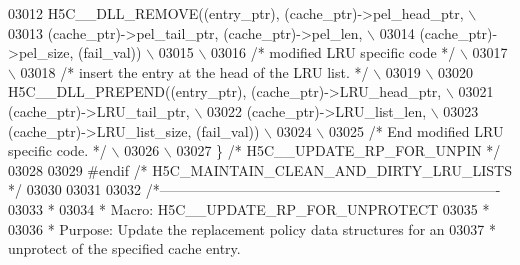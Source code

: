 \begin{DoxyCode}
03012 \textcolor{preprocessor}{    H5C\_\_DLL\_REMOVE((entry\_ptr), (cache\_ptr)->pel\_head\_ptr,            \(\backslash\)}
03013 \textcolor{preprocessor}{                    (cache\_ptr)->pel\_tail\_ptr, (cache\_ptr)->pel\_len,   \(\backslash\)}
03014 \textcolor{preprocessor}{                    (cache\_ptr)->pel\_size, (fail\_val))                 \(\backslash\)}
03015 \textcolor{preprocessor}{                                                                       \(\backslash\)}
03016 \textcolor{preprocessor}{        }\textcolor{comment}{/* modified LRU specific code */}\textcolor{preprocessor}{                               \(\backslash\)}
03017 \textcolor{preprocessor}{                                                                       \(\backslash\)}
03018 \textcolor{preprocessor}{        }\textcolor{comment}{/* insert the entry at the head of the LRU list. */}\textcolor{preprocessor}{            \(\backslash\)}
03019 \textcolor{preprocessor}{                                                                       \(\backslash\)}
03020 \textcolor{preprocessor}{        H5C\_\_DLL\_PREPEND((entry\_ptr), (cache\_ptr)->LRU\_head\_ptr,       \(\backslash\)}
03021 \textcolor{preprocessor}{                         (cache\_ptr)->LRU\_tail\_ptr,                    \(\backslash\)}
03022 \textcolor{preprocessor}{                         (cache\_ptr)->LRU\_list\_len,                    \(\backslash\)}
03023 \textcolor{preprocessor}{                         (cache\_ptr)->LRU\_list\_size, (fail\_val))       \(\backslash\)}
03024 \textcolor{preprocessor}{                                                                       \(\backslash\)}
03025 \textcolor{preprocessor}{        }\textcolor{comment}{/* End modified LRU specific code. */}\textcolor{preprocessor}{                          \(\backslash\)}
03026 \textcolor{preprocessor}{                                                                       \(\backslash\)}
03027 \textcolor{preprocessor}{\} }\textcolor{comment}{/* H5C\_\_UPDATE\_RP\_FOR\_UNPIN */}\textcolor{preprocessor}{}
03028 
03029 \textcolor{preprocessor}{#endif }\textcolor{comment}{/* H5C\_MAINTAIN\_CLEAN\_AND\_DIRTY\_LRU\_LISTS */}\textcolor{preprocessor}{}
03030 
03031 
03032 \textcolor{comment}{/*-------------------------------------------------------------------------}
03033 \textcolor{comment}{ *}
03034 \textcolor{comment}{ * Macro:   H5C\_\_UPDATE\_RP\_FOR\_UNPROTECT}
03035 \textcolor{comment}{ *}
03036 \textcolor{comment}{ * Purpose:     Update the replacement policy data structures for an}
03037 \textcolor{comment}{ *      unprotect of the specified cache entry.}

\end{DoxyCode}
